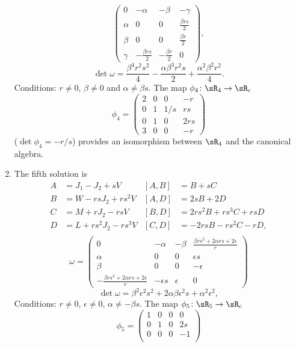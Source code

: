 \begin{enumerate}
\begin{equation}
\begin{pmatrix}
0	&-\alpha		&-\beta	&-\gamma\\
\alpha	&0			&0	&\frac{ \beta r s  }{ 2 }\\
\beta	&0			&0	&\frac{ \beta r }{2}\\
\gamma	&-\frac{ \beta r s  }{ 2 }	&-\frac{ \beta r }{2}	&0
\end{pmatrix},
\end{equation}
\[
\det\omega=\frac{ \beta^{4}r^{2}s^{2} }{ 4 }-\frac{ \alpha\beta^{3}r^{2}s }{ 2 }+\frac{ \alpha^{2}\beta^{2}r^{2} }{ 4 }.
\]
Conditions:  $r\neq 0$, $\beta\neq 0$ and $\alpha\neq\beta s$.  The map $\phi_4\colon \sR_4\to \sR_c$
\[
  \phi_{4}=
\begin{pmatrix}
2&0&0&-r\\
0&1&1/s&rs\\
0&1&0&2rs\\
3&0&0&-r
\end{pmatrix}
\]
($\det\phi_4=-r/s$)  provides an isomorphism between $\sR_{4}$ and the canonical algebra.
\item The fifth solution is
\begin{align*}
A&=J_{1}-J_{2}+sV		&[A,B]&=B+sC\\
B&=W-rsJ_{2}+rs^{2}V		&[A,D]&=2sB+2D\\
C&=M+rJ_{2}-rsV			&[B,D]&=2rs^{2}B+rs^{3}C+rsD\\
D&=L+rs^{2}J_{2}-rs^{3}V	&[C,D]&=-2rsB-rs^{2}C-rD,\\
\end{align*}
\begin{equation}
\omega=\begin{pmatrix}
0&-\alpha&-\beta&\frac{ \beta r s^{2}+2\alpha r s+2\epsilon }{ r }\\
\alpha&0&0&\epsilon s\\
\beta&0&0&-\epsilon\\
-\frac{ \beta r s^{2}+2\alpha r s+2\epsilon }{ r }&-\epsilon s&\epsilon&0
\end{pmatrix}
\end{equation}
\begin{equation}
\det\omega=\beta^{2}\epsilon^{2}s^{2}+2\alpha\beta\epsilon^{2}s+\alpha^{2}\epsilon^{2},
\end{equation}
Conditions:  $r\neq 0$, $\epsilon\neq 0$, $\alpha\neq -\beta s$.  The map $\phi_5\colon \sR_5\to \sR_c$
\begin{equation}
\phi_{5}=
\begin{pmatrix}
1&0&0&0\\
0&1&0&2s\\
0&0&0&-1\\

\end{pmatrix}
\end{equation}
\end{enumerate}
